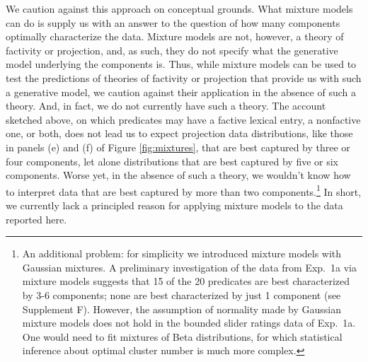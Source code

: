 \documentclass{language}
\newcommand{\6}{\mbox{$[\hspace*{-.6mm}[$}}
\newcommand{\9}{\mbox{$]\hspace*{-.6mm}]$}}
\begin{document}
We caution against this approach on conceptual grounds. What mixture models can do is supply us with an answer to the question of how many components optimally characterize the data. Mixture models are not, however, a theory of factivity or projection, and, as such, they do not specify what the generative model underlying the components is. Thus, while mixture models can be used to test the predictions of theories of factivity or projection that provide us with such a generative model, we caution against their application in the absence of such a theory. And, in fact, we do not currently have such a theory. The account sketched above, on which predicates may have a factive lexical entry, a nonfactive one, or both, does not lead us to expect projection data distributions, like those in panels ({\sc e}) and ({\sc f}) of Figure \ref{fig:mixtures}, that are best captured by three or four components, let alone distributions that are best captured by five or six components. Worse yet, in the absence of such a theory, we wouldn't know how to interpret data that are best captured by more than two components.\footnote{An additional problem: for simplicity we introduced mixture models with Gaussian mixtures. A preliminary investigation of the data from Exp.~1a via mixture models suggests that 15 of the 20 predicates are best characterized by 3-6 components; none are best characterized by just 1 component (see Supplement F).  However, the assumption of normality made by Gaussian mixture models does not hold in the bounded slider ratings data of Exp.~1a. One would need to fit mixtures of Beta distributions, for which statistical inference about optimal cluster number is much more complex.} In short, we  currently lack a principled reason for applying mixture models to the data reported here.
\end{document}
